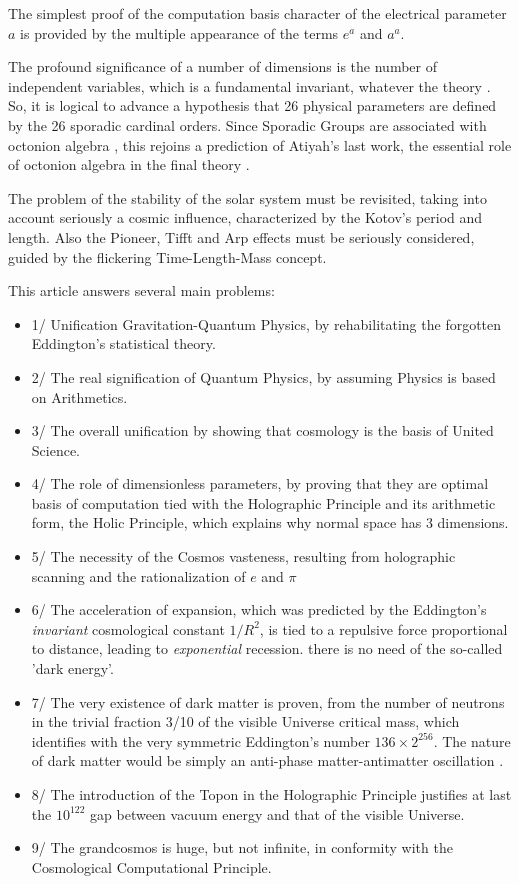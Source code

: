 \documentclass[twoside,draft]{article}
\begin{document}
\begin{sloppypar}
The simplest proof of the computation basis character of the electrical parameter $a$ is provided
by the multiple appearance of the terms $e^{a}$ and $a^{a}$.

The profound significance of a number of dimensions is the number of independent variables,
which is a fundamental invariant, whatever the theory \cite{Weigel}. So, it is logical to advance a
hypothesis that 26 physical parameters are defined by the 26 sporadic cardinal orders. Since
Sporadic Groups are associated with octonion algebra \cite{Atiyah2}, this rejoins a prediction of Atiyah's last
work, the essential role of octonion algebra in the final theory \cite{Koide}.

The problem of the stability of the solar system must be revisited, taking into account
seriously a cosmic influence, characterized by the Kotov's period and length. Also the Pioneer, Tifft
and Arp effects must be seriously considered, guided by the flickering Time-Length-Mass concept.

This article answers several main problems: 
\begin{itemize}
\item 1/ Unification Gravitation-Quantum Physics, by
rehabilitating the forgotten Eddington's statistical theory. 
\item 2/ The real signification of Quantum
Physics, by assuming Physics is based on Arithmetics. 
\item 3/ The overall unification by showing that
cosmology is the basis of United Science. 
\item 4/ The role of dimensionless parameters, by proving that
they are optimal basis of computation tied with the Holographic Principle and its arithmetic form,
the Holic Principle, which explains why normal space has 3 dimensions.
\item 5/ The necessity of the Cosmos vasteness, resulting from holographic scanning and the rationalization of $e$ and $\pi$
\item 6/ The acceleration of expansion, which was predicted by the Eddington's \textit{invariant} cosmological constant $1/R^2$, is tied to a repulsive force proportional to distance, leading to \textit{exponential} recession. there is no need of the so-called 'dark energy'.
\item 7/ The very existence of dark matter is proven, from the number of neutrons in the trivial fraction 3/10 of the visible Universe critical mass, which identifies with the very symmetric Eddington's number $136 \times 2^{256}$. The nature of dark matter would be simply an anti-phase matter-antimatter oscillation \cite{Sanchez1}.  
\item 8/ The introduction of the Topon in the Holographic Principle justifies at last the $10^{122}$ gap between vacuum energy and that of the visible Universe.
\item 9/ The grandcosmos is huge, but not infinite, in conformity with the Cosmological Computational Principle.


\end{itemize}
\end{sloppypar}
\end{document}
